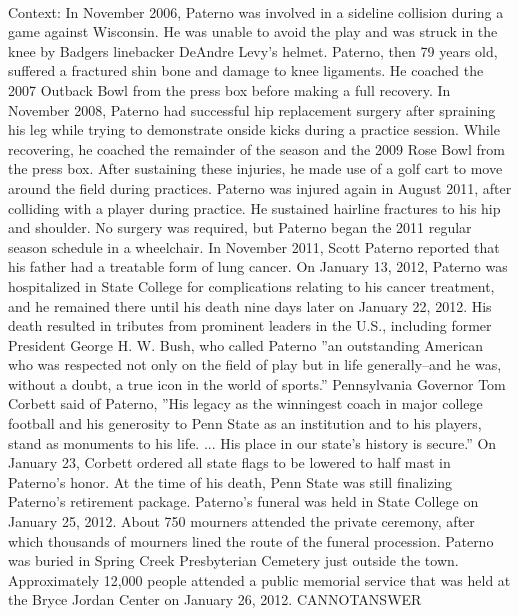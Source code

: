 \documentclass[11pt,a4paper, onecolumn]{article}
\begin{document}
\\ Context: In November 2006, Paterno was involved in a sideline collision during a game against Wisconsin. He was unable to avoid the play and was struck in the knee by Badgers linebacker DeAndre Levy's helmet. Paterno, then 79 years old, suffered a fractured shin bone and damage to knee ligaments. He coached the 2007 Outback Bowl from the press box before making a full recovery. In November 2008, Paterno had successful hip replacement surgery after spraining his leg while trying to demonstrate onside kicks during a practice session. While recovering, he coached the remainder of the season and the 2009 Rose Bowl from the press box. After sustaining these injuries, he made use of a golf cart to move around the field during practices. Paterno was injured again in August 2011, after colliding with a player during practice. He sustained hairline fractures to his hip and shoulder. No surgery was required, but Paterno began the 2011 regular season schedule in a wheelchair. In November 2011, Scott Paterno reported that his father had a treatable form of lung cancer. On January 13, 2012, Paterno was hospitalized in State College for complications relating to his cancer treatment, and he remained there until his death nine days later on January 22, 2012. His death resulted in tributes from prominent leaders in the U.S., including former President George H. W. Bush, who called Paterno ''an outstanding American who was respected not only on the field of play but in life generally--and he was, without a doubt, a true icon in the world of sports.'' Pennsylvania Governor Tom Corbett said of Paterno, ''His legacy as the winningest coach in major college football and his generosity to Penn State as an institution and to his players, stand as monuments to his life. ... His place in our state's history is secure.'' On January 23, Corbett ordered all state flags to be lowered to half mast in Paterno's honor. At the time of his death, Penn State was still finalizing Paterno's retirement package. Paterno's funeral was held in State College on January 25, 2012. About 750 mourners attended the private ceremony, after which thousands of mourners lined the route of the funeral procession. Paterno was buried in Spring Creek Presbyterian Cemetery just outside the town. Approximately 12,000 people attended a public memorial service that was held at the Bryce Jordan Center on January 26, 2012. CANNOTANSWER
\end{document}
